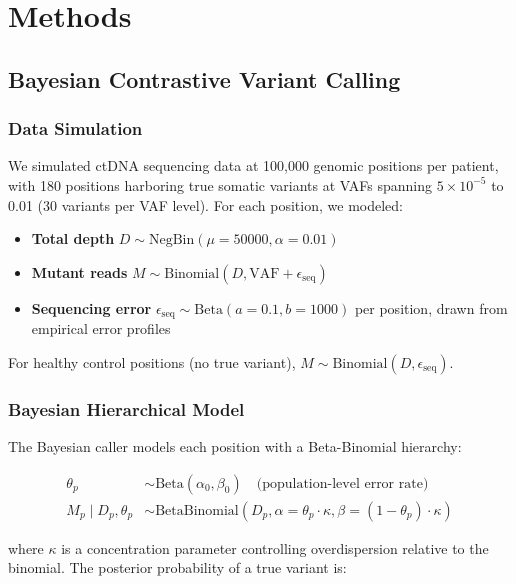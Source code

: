 \documentclass[10pt,a4paper]{article}
\begin{document}
\section{Methods}

\subsection{Bayesian Contrastive Variant Calling}

\subsubsection{Data Simulation}

We simulated ctDNA sequencing data at 100,000 genomic positions per patient, with 180 positions harboring true somatic variants at VAFs spanning $5 \times 10^{-5}$ to 0.01 (30 variants per VAF level). For each position, we modeled:

\begin{itemize}
\item \textbf{Total depth} $D \sim \text{NegBin}(\mu = 50000, \alpha = 0.01)$
\item \textbf{Mutant reads} $M \sim \text{Binomial}(D, \text{VAF} + \epsilon_{\text{seq}})$
\item \textbf{Sequencing error} $\epsilon_{\text{seq}} \sim \text{Beta}(a = 0.1, b = 1000)$ per position, drawn from empirical error profiles
\end{itemize}

For healthy control positions (no true variant), $M \sim \text{Binomial}(D, \epsilon_{\text{seq}})$.

\subsubsection{Bayesian Hierarchical Model}

The Bayesian caller models each position with a Beta-Binomial hierarchy:

\begin{align}
\theta_p &\sim \text{Beta}(\alpha_0, \beta_0) \quad \text{(population-level error rate)} \\
M_p \mid D_p, \theta_p &\sim \text{BetaBinomial}(D_p, \alpha = \theta_p \cdot \kappa, \beta = (1-\theta_p) \cdot \kappa)
\end{align}

where $\kappa$ is a concentration parameter controlling overdispersion relative to the binomial. The posterior probability of a true variant is:
\end{document}
